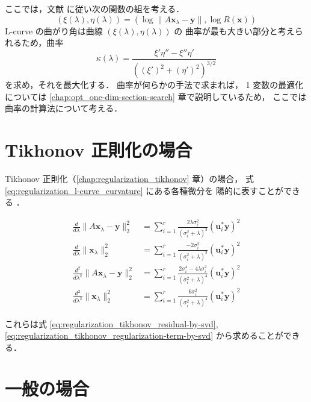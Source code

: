 ここでは，文献 \cite{Hansen1998} に従い次の関数の組を考える．
\begin{equation}
    (\xi(\lambda), \eta(\lambda))
    =(\log\|A \bm{x}_\lambda - \bm{y}\|, \log{R(\bm{x})})
\end{equation}
L-curve の曲がり角は曲線 $(\xi(\lambda), \eta(\lambda))$ の
曲率が最も大きい部分と考えられるため，曲率
\begin{equation}
    \kappa(\lambda) =
    \frac{\xi'\eta'' - \xi''\eta'}
    {\left( (\xi')^2 + (\eta')^2 \right)^{3/2}}
    \label{eq:regularization_l-curve_curvature}
\end{equation}
を求め，それを最大化する．
曲率が何らかの手法で求まれば，
1 変数の最適化については
\ref{chap:opt_one-dim-section-search} 章で説明しているため，
ここでは曲率の計算法について考える．

\section{Tikhonov 正則化の場合}

Tikhonov 正則化（\ref{chap:regularization_tikhonov} 章）の場合，
式 \eqref{eq:regularization_l-curve_curvature} にある各種微分を
陽的に表すことができる
\cite{Hansen1992,Mueller2012}．

\begin{align}
    \frac{d}{d\lambda} \|A \bm{x}_\lambda - \bm{y}\|_2^2
     & = \sum_{i=1}^r \frac{2 \lambda \sigma_i^2}{(\sigma_i^2 + \lambda)^3}
    \left(\bm{u}_i^* \bm{y}\right)^2
    \\
    \frac{d}{d\lambda} \|\bm{x}_\lambda\|_2^2
     & = \sum_{i=1}^r \frac{-2 \sigma_i^2}{(\sigma_i^2 + \lambda)^3}
    \left(\bm{u}_i^* \bm{y}\right)^2
    \\
    \frac{d^2}{d\lambda^2} \|A \bm{x}_\lambda - \bm{y}\|_2^2
     & = \sum_{i=1}^r \frac{2 \sigma_i^4 - 4 \lambda \sigma_i^2}
    {(\sigma_i^2 + \lambda)^4}
    \left(\bm{u}_i^* \bm{y}\right)^2
    \\
    \frac{d^2}{d\lambda^2} \|\bm{x}_\lambda\|_2^2
     & = \sum_{i=1}^r \frac{6 \sigma_i^2}{(\sigma_i^2 + \lambda)^4}
    \left(\bm{u}_i^* \bm{y}\right)^2
\end{align}

これらは式
\eqref{eq:regularization_tikhonov_residual-by-svd},
\eqref{eq:regularization_tikhonov_regularization-term-by-svd}
から求めることができる．

\section{一般の場合}


